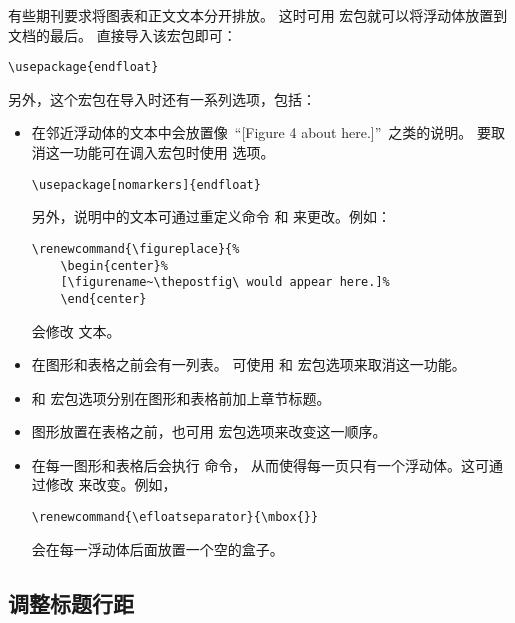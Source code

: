 有些期刊要求将图表和正文文本分开排放。
这时可用  宏包就可以将浮动体放置到文档的最后。
直接导入该宏包即可：
\begin{lstlisting}
\usepackage{endfloat}
\end{lstlisting}
另外，这个宏包在导入时还有一系列选项，包括：
\begin{itemize}
	\item 在邻近浮动体的文本中会放置像~``[Figure 4 about here.]''~之类的说明。
	要取消这一功能可在调入宏包时使用  选项。
\begin{lstlisting}
\usepackage[nomarkers]{endfloat}
\end{lstlisting}
	另外，说明中的文本可通过重定义命令  和  来更改。例如：
\begin{lstlisting}
\renewcommand{\figureplace}{% 
	\begin{center}% 
	[\figurename~\thepostfig\ would appear here.]% 
	\end{center}
\end{lstlisting}
	会修改  文本。
	
	\item 在图形和表格之前会有一列表。
	可使用  和  宏包选项来取消这一功能。
	
	\item {} 和  宏包选项分别在图形和表格前加上章节标题。
	
	\item 图形放置在表格之前，也可用  宏包选项来改变这一顺序。
	
	\item 在每一图形和表格后会执行  命令，
	从而使得每一页只有一个浮动体。这可通过修改  来改变。例如，
\begin{lstlisting}
\renewcommand{\efloatseparator}{\mbox{}}
\end{lstlisting}
	会在每一浮动体后面放置一个空的盒子。
\end{itemize}

\subsection{调整标题行距}\label{ssec:caplinspacing}

